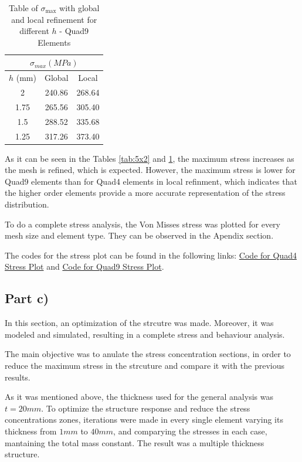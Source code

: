 \begin{table}[H]
  \centering
\caption{Table of $\sigma_{\max}$ with global and local refinement for different $h$ - Quad9 Elements}
  \begin{tabular}{|c|c|c|}
    \hline
    \multicolumn{3}{|c|}{$\sigma_{max} (MPa)$} \\ \hline
    $h$ (mm) & Global & Local \\ \hline
    2 & 240.86 & 268.64 \\ \hline
    1.75 & 265.56 & 305.40 \\ \hline
    1.5 & 288.52 & 335.68 \\ \hline
    1.25 & 317.26 & 373.40 \\ \hline
  \end{tabular}
  \label{tab:12}
\end{table}

As it can be seen in the Tables \ref{tab:5x2} and \ref{tab:12}, the maximum stress increases as the mesh is refined, which is expected. However, the maximum stress is lower for Quad9 elements than for Quad4 elements in local refinment, which indicates that the higher order elements provide a more accurate representation of the stress distribution.

To do a complete stress analysis, the Von Misses stress was plotted for every mesh size and element type. They can be observed in the Apendix section. 

The codes for the stress plot can be found in the following links: \href{https://github.com/LukasWolff2002/TAREA_3_FINITE/blob/main/ENTREGA_2/QUAD4/graph.py}{Code for Quad4 Stress Plot} and \href{https://github.com/LukasWolff2002/TAREA_3_FINITE/blob/main/ENTREGA_2/QUAD9/graph.py}{Code for Quad9 Stress Plot}.

\subsection{Part c)}

In this section, an optimization of the strcutre was made. Moreover, it was modeled and simulated, resulting in a complete stress and behaviour analysis.

The main objective was to anulate the stress concentration sections, in order to reduce the maximum stress in the strcuture and compare it with the previous results.

As it was mentioned above, the thickness used for the general analysis was $t=20mm$. To optimize the structure response and reduce the stress concentrations zones, iterations were made in every single element varying its thickness from $1mm$ to $40mm$, and comparying the stresses in each case, mantaining the total mass constant. The result was a multiple thickness structure.

